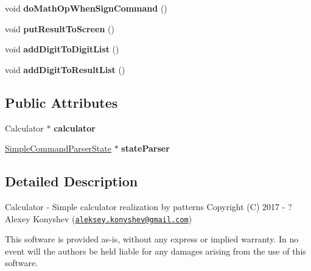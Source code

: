 \begin{DoxyCompactItemize}
\item 
\hypertarget{class_simple_command_parser_a0d0205d4d10998bad63e2c48b7a41054}{}void {\bfseries do\+Math\+Op\+When\+Sign\+Command} ()\label{class_simple_command_parser_a0d0205d4d10998bad63e2c48b7a41054}

\item 
\hypertarget{class_simple_command_parser_aa02939ea765a1086b025862cf8243d34}{}void {\bfseries put\+Result\+To\+Screen} ()\label{class_simple_command_parser_aa02939ea765a1086b025862cf8243d34}

\item 
\hypertarget{class_simple_command_parser_ab89c0661f33a83df7c594e26f508e8ea}{}void {\bfseries add\+Digit\+To\+Digit\+List} ()\label{class_simple_command_parser_ab89c0661f33a83df7c594e26f508e8ea}

\item 
\hypertarget{class_simple_command_parser_a2aa1f98b29f3b6770e86913da8141be4}{}void {\bfseries add\+Digit\+To\+Result\+List} ()\label{class_simple_command_parser_a2aa1f98b29f3b6770e86913da8141be4}

\end{DoxyCompactItemize}
\subsection*{Public Attributes}
\begin{DoxyCompactItemize}
\item 
\hypertarget{class_simple_command_parser_a89b6340ce40c9a4c444876ebdc3d0de2}{}Calculator $\ast$ {\bfseries calculator}\label{class_simple_command_parser_a89b6340ce40c9a4c444876ebdc3d0de2}

\item 
\hypertarget{class_simple_command_parser_a4b66f3e8e15338b02a7f71477d6daa38}{}\hyperlink{class_simple_command_parser_state}{Simple\+Command\+Parser\+State} $\ast$ {\bfseries state\+Parser}\label{class_simple_command_parser_a4b66f3e8e15338b02a7f71477d6daa38}

\end{DoxyCompactItemize}


\subsection{Detailed Description}
Calculator -\/ Simple calculator realization by patterns Copyright (C) 2017 -\/ ? Alexey Konyshev (\href{mailto:aleksey.konyshev@gmail.com}{\tt aleksey.\+konyshev@gmail.\+com})

This software is provided \textquotesingle{}as-\/is\textquotesingle{}, without any express or implied warranty. In no event will the authors be held liable for any damages arising from the use of this software.

